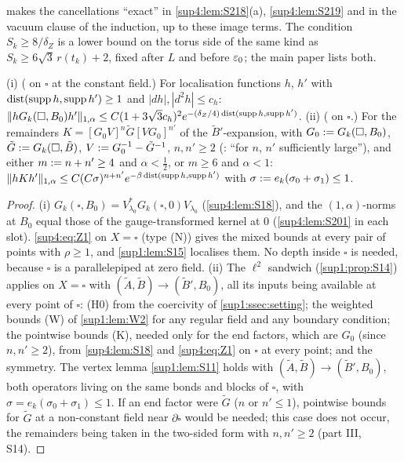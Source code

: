  makes the cancellations ``exact'' in \cref{sup4:lem:S218}(a), \cref{sup4:lem:S219} and in the vacuum clause of the induction, up to these image terms. The condition $S_k\ge8/\delta_Z$ is a lower bound on the torus side of the same kind as $S_k\ge6\sqrt3\,r(t_k)+2$, fixed after $L$ and before $\varepsilon_0$; the main paper lists both.

\begin{lemma}\label{sup4:lem:F3}
\textup{(i)} (\cite[(3.1)]{Ba3} on $\square$ at the constant field.) For localisation functions $h$, $h'$ with $\operatorname{dist}(\operatorname{supp} h,\operatorname{supp} h')\ge1$ and $|dh|,|d^2h|\le c_h$: $\lVert hG_k(\square,B_0)h'\rVert_{1,\alpha}\le C(1+3\sqrt3c_h)^2e^{-(\delta_Z/4)\operatorname{dist}(\operatorname{supp} h,\operatorname{supp} h')}$. \textup{(ii)} (\cite[(1.16)]{Ba3} on $\square$.) For the remainders $K=[G_0V]^n\tilde G[VG_0]^{n'}$ of the $\tilde B'$-expansion, with $G_0:= G_k(\square,B_0)$, $\tilde G:= G_k(\square,\tilde B)$, $V:= G_0^{-1}-\tilde G^{-1}$, $n,n'\ge2$ (\cite[p.~414]{Ba3}: ``for $n$, $n'$ sufficiently large''), and either $m:= n+n'\ge4$ and $\alpha<\frac12$, or $m\ge6$ and $\alpha<1$: $\lVert hKh'\rVert_{1,\alpha}\le C(C\sigma)^{n+n'}e^{-\beta\operatorname{dist}(\operatorname{supp} h,\operatorname{supp} h')}$ with $\sigma:= e_k(\sigma_0+\sigma_1)\le1$.
\end{lemma}

\begin{proof}
(i) $G_k(\square,B_0)=V_{\lambda_0}^*G_k(\square,0)V_{\lambda_0}$ (\cref{sup4:lem:S18}), and the $(1,\alpha)$-norms at $B_0$ equal those of the gauge-transformed kernel at $0$ (\cref{sup4:lem:S201} in each slot). \eqref{sup4:eq:Z1} on $X=\square$ (type (N)) gives the mixed bounds at every pair of points with $\rho\ge1$, and \cref{sup1:lem:S15} localises them. No depth inside $\square$ is needed, because $\square$ is a parallelepiped at zero field. (ii) The $\ell^2$ sandwich (\cref{sup1:prop:S14}) applies on $X=\square$ with $(\tilde A,\tilde B)\to(\tilde B',B_0)$, all its inputs being available at every point of $\square$: (H0) from the coercivity of \cref{sup1:ssec:setting}; the weighted bounds (W) of \cref{sup1:lem:W2} for any regular field and any boundary condition; the pointwise bounds (K), needed only for the end factors, which are $G_0$ (since $n,n'\ge2$), from \cref{sup4:lem:S18} and \eqref{sup4:eq:Z1} on $\square$ at every point; and the symmetry. The vertex lemma \cref{sup1:lem:S11} holds with $(\tilde A,\tilde B)\to(\tilde B',B_0)$, both operators living on the same bonds and blocks of $\square$, with $\sigma=e_k(\sigma_0+\sigma_1)\le1$. If an end factor were $\tilde G$ ($n$ or $n'\le1$), pointwise bounds for $\tilde G$ at a non-constant field near $\partial\square$ would be needed; this case does not occur, the remainders being taken in the two-sided form with $n,n'\ge2$ (part III, S14).
\end{proof}

